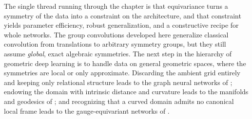 The single thread running through the chapter is that equivariance turns a
symmetry of the data into a constraint on the architecture, and that constraint
yields parameter efficiency, robust generalization, and a constructive recipe
for whole networks. The group convolutions developed here generalize classical
convolution from translations to arbitrary symmetry groups, but they still assume
\emph{global}, exact algebraic symmetries. The next step in the hierarchy of
geometric deep learning is to handle data on general geometric spaces, where the
symmetries are local or only approximate. Discarding the ambient grid entirely
and keeping only relational structure leads to the graph neural networks of
; endowing the domain with intrinsic distance and curvature leads
to the manifolds and geodesics of ; and recognizing that a
curved domain admits no canonical local frame leads to the gauge-equivariant
networks of .
